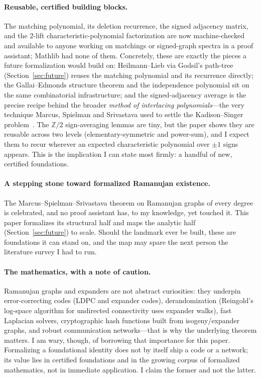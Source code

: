 \documentclass[11pt]{article}
\newcommand{\Z}{\mathbb{Z}}
\begin{document}
\paragraph{Reusable, certified building blocks.}
The matching polynomial, its deletion recurrence, the signed adjacency matrix,
and the $2$-lift characteristic-polynomial factorization are now
machine-checked and available to anyone working on matchings or signed-graph
spectra in a proof assistant; Mathlib had none of them. Concretely, these are
exactly the pieces a future formalization would build on: Heilmann--Lieb via
Godsil's path-tree (Section~\ref{sec:future}) reuses the matching polynomial and
its recurrence directly; the Gallai--Edmonds structure theorem and the
independence polynomial sit on the same combinatorial infrastructure; and the
signed-adjacency average is the precise recipe behind the broader \emph{method
of interlacing polynomials}---the very technique Marcus, Spielman and Srivastava
used to settle the Kadison--Singer problem~\cite{MSS2015b}. The $\Z/2$
sign-averaging lemmas are tiny, but the paper shows they are reusable across two
levels (elementary-symmetric and power-sum), and I expect them to recur wherever
an expected characteristic polynomial over $\pm1$ signs appears. This is the
implication I can state most firmly: a handful of new, certified foundations.

\paragraph{A stepping stone toward formalized Ramanujan existence.}
The Marcus--Spielman--Srivastava theorem on Ramanujan graphs of every degree is
celebrated, and no proof assistant has, to my knowledge, yet touched it. This paper
formalizes its structural half and maps the analytic half
(Section~\ref{sec:future}) to scale. Should the landmark ever be built, these
are foundations it can stand on, and the map may spare the next person the
literature survey I had to run.

\paragraph{The mathematics, with a note of caution.}
Ramanujan graphs and expanders are not abstract curiosities: they underpin
error-correcting codes (LDPC and expander codes), derandomization (Reingold's
log-space algorithm for undirected connectivity uses expander walks), fast
Laplacian solvers, cryptographic hash functions built from isogeny/expander
graphs, and robust communication networks---that is why the underlying theorem
matters. I am wary, though, of borrowing that importance for this paper. Formalizing a foundational identity does not by itself ship a code
or a network; its value lies in certified foundations and in the growing corpus
of formalized mathematics, not in immediate application. I claim the former and
not the latter.
\end{document}
